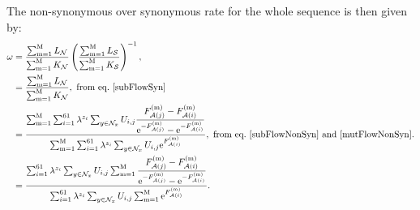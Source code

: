 The non-synonymous over synonymous rate for the whole sequence is then given by:
\begin{align}
    \omega
    & = \dfrac{\sum_{\site=1}^{\Nsite} L_{\NonSyn}}{\sum_{\site=1}^{\Nsite}K_{\NonSyn}}  \left( \dfrac{\sum_{\site=1}^{\Nsite}L_{\Syn}}{\sum_{\site=1}^{\Nsite}K_{\Syn}}  \right)^{-1}, \\
    & = \dfrac{\sum_{\site=1}^{\Nsite} L_{\NonSyn}}{\sum_{\site=1}^{\Nsite}K_{\NonSyn}}, \ \textrm{from eq.}\ \ref{subFlowSyn} \\
    & = \dfrac{ \sum_{\site=1}^{\Nsite} \sum_{\ci=1}^{61} \lambda^{\nbrWeak_{\ci}} \sum_{y \in \NxNonSyn}  U_{\itoj} \dfrac{\Fitj\siteexp - \Fiti\siteexp}{\e^{ - \Fitj\siteexp} -  \e^{- \Fiti\siteexp} } }{ \sum_{\site=1}^{\Nsite} \sum_{\ci=1}^{61}  \lambda^{\nbrWeak_{\ci}}  \sum_{y \in \NxNonSyn} U_{\itoj} \e^{\Fiti\siteexp}}, \ \textrm{from eq.}\ \ref{subFlowNonSyn} \ \text{and} \ \ref{mutFlowNonSyn}.
    \\
    & = \dfrac{ \sum_{\ci=1}^{61} \lambda^{\nbrWeak_{\ci}} \sum_{y \in \NxNonSyn}  U_{\itoj}  \sum_{\site=1}^{\Nsite} \dfrac{\Fitj\siteexp - \Fiti\siteexp}{\e^{ - \Fitj\siteexp} -  \e^{- \Fiti\siteexp} } }{  \sum_{\ci=1}^{61}  \lambda^{\nbrWeak_{\ci}}  \sum_{y \in \NxNonSyn} U_{\itoj}  \sum_{\site=1}^{\Nsite} \e^{\Fiti\siteexp}}.
    \label{omegaSeq}
\end{align}